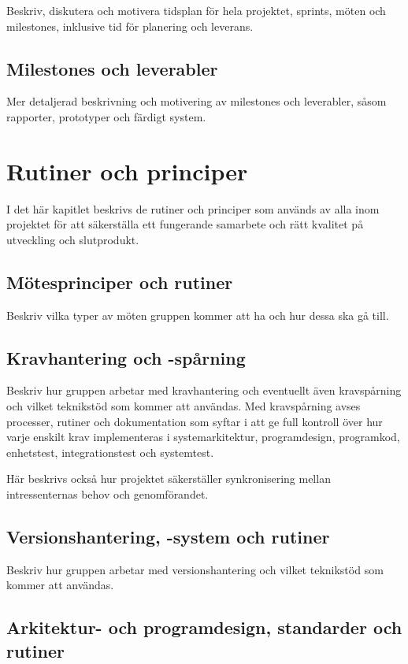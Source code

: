 \documentclass[a4paper,12pt,oneside,final]{extbook}
\begin{document}
Beskriv, diskutera och motivera tidsplan för hela projektet, sprints,
möten och milestones, inklusive tid för planering och leverans.

\section{Milestones och leverabler}

Mer detaljerad beskrivning och motivering av milestones och
leverabler, såsom rapporter, prototyper och färdigt system.

\chapter{Rutiner och principer}

I det här kapitlet beskrivs de rutiner och principer som används av
alla inom projektet för att säkerställa ett fungerande samarbete och
rätt kvalitet på utveckling och slutprodukt.

\section{Mötesprinciper och rutiner}

Beskriv vilka typer av möten gruppen kommer att ha och hur dessa ska
gå till.

\section{Kravhantering och -spårning}

Beskriv hur gruppen arbetar med kravhantering och eventuellt även
kravspårning och vilket teknikstöd som kommer att användas. Med
kravspårning avses processer, rutiner och dokumentation som syftar i att
ge full kontroll över hur varje enskilt krav implementeras i
systemarkitektur, programdesign, programkod, enhetstest,
integrationstest och systemtest.

Här beskrivs också hur projektet säkerställer synkronisering mellan
intressenternas behov och genomförandet.

\section{Versionshantering, -system och rutiner}

Beskriv hur gruppen arbetar med versionshantering och vilket
teknikstöd som kommer att användas.

\section{Arkitektur- och programdesign, standarder och rutiner}
\end{document}
